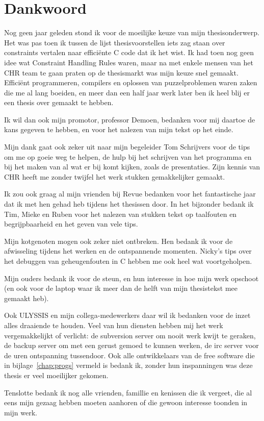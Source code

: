 \section*{Dankwoord}

Nog geen jaar geleden stond ik voor de moeilijke keuze van mijn thesisonderwerp. Het was pas toen ik tussen de lijst thesisvoorstellen iets zag staan over constraints vertalen naar effici\"ente C code dat ik het wist. Ik had toen nog geen idee wat Constraint Handling Rules waren, maar na met enkele mensen van het CHR team te gaan praten op de thesismarkt was mijn keuze snel gemaakt. Effici\"ent programmeren, compilers en oplossen van puzzelproblemen waren zaken die me al lang boeiden, en meer dan een half jaar werk later ben ik heel blij er een thesis over gemaakt te hebben.

Ik wil dan ook mijn promotor, professor Demoen, bedanken voor mij daartoe de kans gegeven te hebben, en voor het nalezen van mijn tekst op het einde.

Mijn dank gaat ook zeker uit naar mijn begeleider Tom Schrijvers voor de tips om me op goeie weg te helpen, de hulp bij het schrijven van het programma en bij het maken van al wat er bij komt kijken, zoals de presentaties. Zijn kennis van CHR heeft me zonder twijfel het werk stukken gemakkelijker gemaakt.

Ik zou ook graag al mijn vrienden bij Revue bedanken voor het fantastische jaar dat ik met hen gehad heb tijdens het thesissen door. In het bijzonder bedank ik Tim, Mieke en Ruben voor het nalezen van stukken tekst op taalfouten en begrijpbaarheid en het geven van vele tips.

Mijn kotgenoten mogen ook zeker niet ontbreken. Hen bedank ik voor de afwisseling tijdens het werken en de ontspannende momenten. Nicky's tips over het debuggen van geheugenfouten in C hebben me ook heel wat voortgeholpen.

Mijn ouders bedank ik voor de steun, en hun interesse in hoe mijn werk opschoot (en ook voor de laptop waar ik meer dan de helft van mijn thesistekst mee gemaakt heb).

Ook ULYSSIS en mijn collega-medewerkers daar wil ik bedanken voor de inzet alles draaiende te houden. Veel van hun diensten hebben mij het werk vergemakkelijkt of verlicht: de subversion server om nooit werk kwijt te geraken, de backup server om met een gerust gemoed te kunnen werken, de irc server voor de uren ontspanning tussendoor. Ook alle ontwikkelaars van de free software die in bijlage~\ref{chap:progs} vermeld is bedank ik, zonder hun inspanningen was deze thesis er veel moeilijker gekomen.

Tenslotte bedank ik nog alle vrienden, famillie en kenissen die ik vergeet, die al eens mijn gezaag hebben moeten aanhoren of die gewoon interesse toonden in mijn werk.